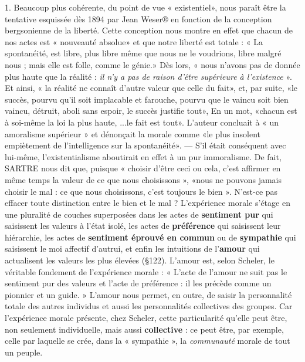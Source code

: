 1. Beaucoup plus cohérente, du point de vue « existentiel», nous paraît être la tentative
esquissée dès 1894 par Jean Weser® en fonction de la conception bergsonienne de
la liberté. Cette conception nous montre en effet que chacun de nos actes est « nouveauté
absolue» et que notre liberté est totale : « La spontanéité, est libre, plus libre même
que nous ne le voudrions, libre malgré nous ; mais elle est folle, comme le génie.» Dès
lors, « nous n'avons pas de donnée plus haute que la réalité : {\it il n'y a pas de raison
d'être supérieure à l'existence} ». Et ainsi, « la réalité ne connaît d'autre valeur que celle
du fait», et, par suite, «le succès, pourvu qu'il soit implacable et farouche, pourvu que
le vaincu soit bien vaincu, détruit, aboli sans espoir, le succès justifie tout», En un mot,
«chacun est à soi-même la loi la plus haute, ...le fait est tout». L'auteur concluait à « un
amoralisme supérieur » et dénonçait la morale comme «le plus insolent empiètement de
l'intelligence sur la spontanéité». — S'il était conséquent avec lui-même, l'existentialisme
aboutirait en effet à un pur immoralisme. De fait, SARTRE nous dit que, puisque
« choisir d’être ceci ou cela, c'est affirmer en même temps la valeur de ce que nous
choisissons », «nous ne pouvons jamais choisir le mal : ce que nous choisissons, c'est
toujours le bien ». N'est-ce pas effacer toute distinction entre le bien et le mal ?
L'expérience morale s’étage en une pluralité de couches superposées
dans les actes de {\bf sentiment pur} qui saisissent les valeurs à l’état
isolé, les actes de {\bf préférence} qui saisissent leur hiérarchie, les actes de
{\bf sentiment éprouvé en commun} ou de {\bf sympathie} qui saisissent le
moi affectif d'autrui, et enfin les intuitions de l’{\bf amour} qui actualisent
les valeurs les plus élevées (\S 122). L'amour est, selon Scheler, le véritable
fondement de l’expérience morale : « L'acte de l’amour ne suit
pas le sentiment pur des valeurs et l’acte de préférence : il les précède
comme un pionnier et un guide. » L’amour nous permet, en outre,
de saisir la personnalité totale des autres individus et aussi les personnalités
collectives des groupes. Car l’expérience morale présente, chez
Scheler, cette particularité qu’elle peut être, non seulement individuelle,
mais aussi {\bf collective} : ce peut être, par exemple, celle par
laquelle se crée, dans la « sympathie », la {\it communauté} morale de tout
un peuple.

